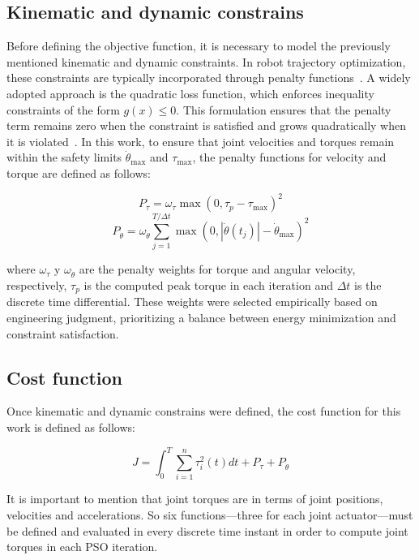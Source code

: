 \documentclass[runningheads]{llncs}
\begin{document}
\subsection{Kinematic and dynamic constrains}
Before defining the objective function, it is necessary to model the previously mentioned kinematic and dynamic constraints. In robot trajectory optimization, these constraints are typically incorporated through penalty functions~\cite{ref_penaltyfunc}. A widely adopted approach is the quadratic loss function, which enforces inequality constraints of the form $g(x) \leq 0$. This formulation ensures that the penalty term remains zero when the constraint is satisfied and grows quadratically when it is violated~\cite{ref_quadloss}. In this work, to ensure that joint velocities and torques remain within the safety limits $\dot{\theta}_{\max}$ and $\tau_{\max}$, the penalty functions for velocity and torque are defined as follows:


\begin{equation}
    P_\tau = \omega_\tau\max(0,\tau_p-\tau_{\max})^2
\end{equation}
\begin{equation}
    P_{\dot \theta}=\omega_{\dot \theta}\sum _{j=1}^{T/\Delta t} \max \left (0,|\dot \theta(t_j)| - \dot \theta_{\max}\right ) ^2
\end{equation}

where $\omega_\tau$ y $\omega_{\dot \theta}$ are the penalty weights for torque and angular velocity, respectively, $\tau_p$ is the computed peak torque in each iteration and $\Delta t$ is the discrete time differential. These weights were selected empirically based on engineering judgment, prioritizing a balance between energy minimization and 
constraint satisfaction. 

\subsection{Cost function}
Once kinematic and dynamic constrains were defined, the cost function for this work is defined as follows:

\begin{equation}
    J=\int_0^T\sum_{i=1}^n \tau_i ^2(t)dt +P_\tau + P_{\dot \theta}
\end{equation}

It is important to mention that joint torques are in terms of joint positions, velocities and accelerations. So six functions---three for each joint actuator---must be defined and evaluated in every discrete time instant in order to compute joint torques in each PSO iteration.
\end{document}
